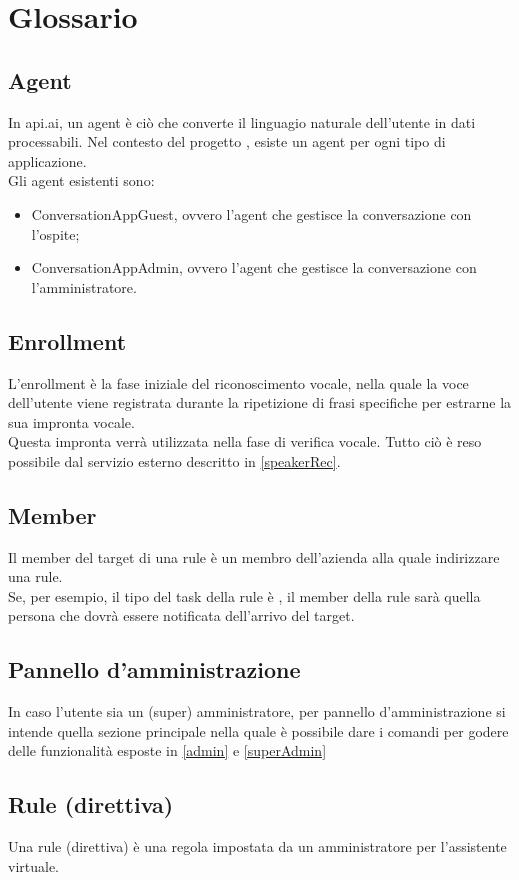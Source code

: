 \section{Glossario}
\subsection{Agent}
In api.ai, un agent è ciò che converte il linguagio naturale dell'utente in dati processabili. Nel contesto del progetto \PROGETTO, esiste un agent per ogni tipo di applicazione.\\
Gli agent esistenti sono:
\begin{itemize}
	\item ConversationAppGuest, ovvero l'agent che gestisce la conversazione con l'ospite;
	\item ConversationAppAdmin, ovvero l'agent che gestisce la conversazione con l'amministratore.
\end{itemize}
\subsection{Enrollment}
L'enrollment è la fase iniziale del riconoscimento vocale, nella quale la voce dell’utente viene registrata durante la ripetizione di frasi specifiche per estrarne la sua impronta vocale.\\
Questa impronta verrà utilizzata nella fase di verifica vocale. Tutto ciò è reso possibile dal servizio esterno descritto in \ref{speakerRec}.
\subsection{Member}
Il member del target di una rule è un membro dell'azienda alla quale indirizzare una rule. \\
Se, per esempio, il tipo del task della rule è , il member della rule sarà quella persona che dovrà essere notificata dell'arrivo del target.
\subsection{Pannello d'amministrazione}
In caso l'utente sia un (super) amministratore, per pannello d'amministrazione si intende quella sezione principale nella quale è possibile dare i comandi per godere delle funzionalità esposte in \ref{admin} e \ref{superAdmin}
\subsection{Rule (direttiva)}
Una rule (direttiva) è una regola impostata da un amministratore per l'assistente virtuale.

